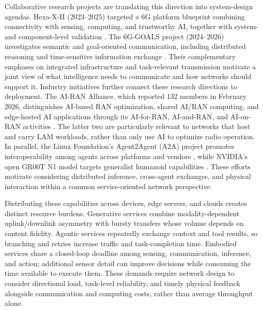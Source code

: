 \documentclass[letterpaper,journal]{IEEEtran}
\begin{document}
Collaborative research projects are translating this direction into
system-design agendas. Hexa-X-II (2023--2025) targeted a 6G platform
blueprint combining connectivity with sensing, computing, and trustworthy
AI, together with system- and component-level validation
\cite{hexaxii}. The 6G-GOALS project (2024--2026) investigates semantic and
goal-oriented communication, including distributed reasoning and
time-sensitive information exchange \cite{6ggoals}. Their complementary
emphases on integrated infrastructure and task-relevant transmission
motivate a joint view of what intelligence needs to communicate and how
networks should support it. Industry initiatives further connect these research directions to
deployment. The AI-RAN Alliance, which reported 132 members in February
2026, distinguishes AI-based RAN optimization, shared AI/RAN computing,
and edge-hosted AI applications through its AI-for-RAN, AI-and-RAN, and
AI-on-RAN activities \cite{airan2026}. The latter two are particularly
relevant to networks that host and carry LAM workloads, rather than only
use AI to optimize radio operation. In parallel, the Linux Foundation's
Agent2Agent (A2A) project promotes interoperability among agents across
platforms and vendors \cite{a2aproject}, while NVIDIA's open GR00T N1
model targets generalist humanoid capabilities \cite{groot}. These efforts
motivate considering distributed inference, cross-agent exchanges, and
physical interaction within a common service-oriented network perspective.

Distributing these capabilities across devices, edge servers, and clouds
creates distinct resource burdens.
Generative services combine modality-dependent uplink/downlink asymmetry
with bursty transfers whose volume depends on content fidelity. Agentic
services repeatedly exchange context and tool results, so branching and
retries increase traffic and task-completion time. Embodied services share
a closed-loop deadline among sensing, communication, inference, and action;
additional sensor detail can improve decisions while consuming the time
available to execute them. These demands require network design to consider
directional load, task-level reliability, and timely physical feedback
alongside communication and computing costs, rather than average throughput
alone.
\end{document}
